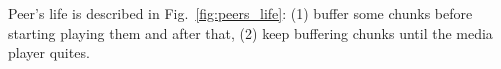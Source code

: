 \label{sec:peers_life}

\begin{figure*}
   \caption{Main actions carried out by a
    peer.\label{fig:peers_life}}
\end{figure*}

Peer's life is described in Fig.~\ref{fig:peers_life}: (1) buffer some
chunks before starting playing them and after that, (2) keep buffering
chunks until the media player quites.
